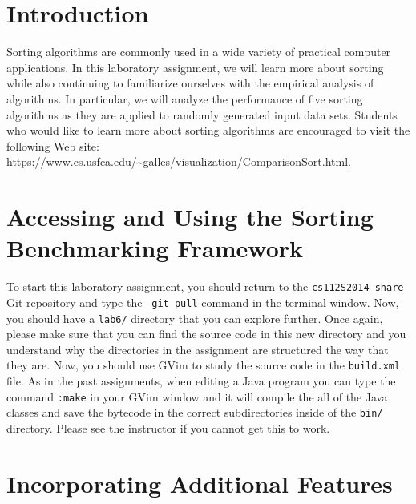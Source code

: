 


\usepackage[compact]{titlesec}


\section*{Introduction}

Sorting algorithms are commonly used in a wide variety of practical computer applications.  In this laboratory
assignment, we will learn more about sorting while also continuing to familiarize ourselves with the empirical analysis
of algorithms.  In particular, we will analyze the performance of five sorting algorithms as they are applied to
randomly generated input data sets.  Students who would like to learn more about sorting algorithms are encouraged to
visit the following Web site: \url{https://www.cs.usfca.edu/~galles/visualization/ComparisonSort.html}.

\section*{Accessing and Using the Sorting Benchmarking Framework}

To start this laboratory assignment, you should return to the {\tt cs112S2014-share} Git repository and type the {\tt
git pull} command in the terminal window.  Now, you should have a {\tt lab6/} directory that you can explore further.
Once again, please make sure that you can find the source code in this new directory and you understand why the
directories in the assignment are structured the way that they are. Now, you should use GVim to study the source code in
the {\tt build.xml} file.  As in the past assignments, when editing a Java program you can type the command {\tt :make}
in your GVim window and it will compile the all of the Java classes and save the bytecode in the correct subdirectories
inside of the {\tt bin/} directory.  Please see the instructor if you cannot get this to work.


\section*{Incorporating Additional Features}

